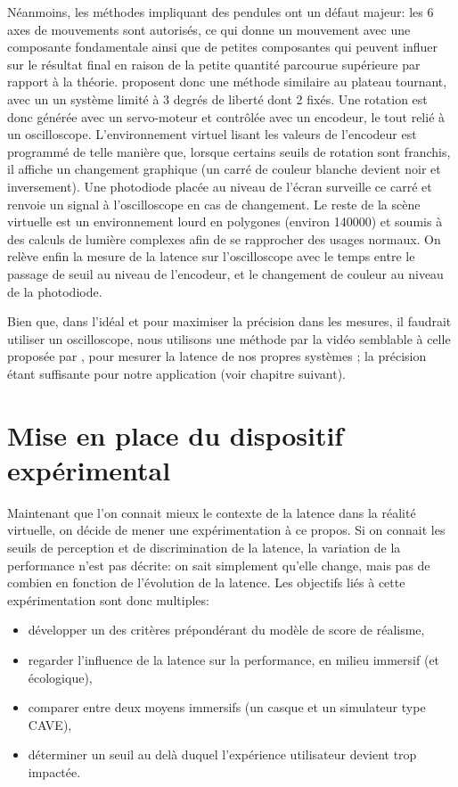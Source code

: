 	\par Néanmoins, les méthodes impliquant des pendules ont un défaut majeur: les 6 axes de mouvements sont autorisés, ce qui donne un mouvement avec une composante fondamentale ainsi que de petites composantes qui peuvent influer sur le résultat final en raison de la petite quantité parcourue supérieure par rapport à la théorie. \citep{papadakis_system_2011} proposent donc une méthode similaire au plateau tournant, avec un un système limité à 3 degrés de liberté dont 2 fixés. Une rotation est donc générée avec un servo-moteur et contrôlée avec un encodeur, le tout relié à un oscilloscope. L'environnement virtuel lisant les valeurs de l'encodeur est programmé de telle manière que, lorsque certains seuils de rotation sont franchis, il affiche un changement graphique (un carré de couleur blanche devient noir et inversement). Une photodiode placée au niveau de l'écran surveille ce carré et renvoie un signal à l'oscilloscope en cas de changement. Le reste de la scène virtuelle est un environnement lourd en polygones (environ 140000) et soumis à des calculs de lumière complexes afin de se rapprocher des usages normaux. On relève enfin la mesure de la latence sur l'oscilloscope avec le temps entre le passage de seuil au niveau de l'encodeur, et le changement de couleur au niveau de la photodiode.
	
	\par Bien que, dans l'idéal et pour maximiser la précision dans les mesures, il faudrait utiliser un oscilloscope, nous utilisons une méthode par la vidéo semblable à celle proposée par \citep{steed_simple_2008}, pour mesurer la latence de nos propres systèmes ; la précision étant suffisante pour notre application (voir chapitre suivant).
	
	
\chapter{Mise en place du dispositif expérimental}
	\par Maintenant que l'on connait mieux le contexte de la latence dans la réalité virtuelle, on décide de mener une expérimentation à ce propos. Si on connait les seuils de perception et de discrimination de la latence, la variation de la performance n'est pas décrite: on sait simplement qu'elle change, mais pas de combien en fonction de l'évolution de la latence. Les objectifs liés à cette expérimentation sont donc multiples:
	
	\begin{itemize}
		\item développer un des critères prépondérant du modèle de score de réalisme,
		\item regarder l'influence de la latence sur la performance, en milieu immersif (et écologique),
		\item comparer entre deux moyens immersifs (un casque et un simulateur type CAVE),
		\item déterminer un seuil au delà duquel l'expérience utilisateur devient trop impactée. 
	\end{itemize}	
	
